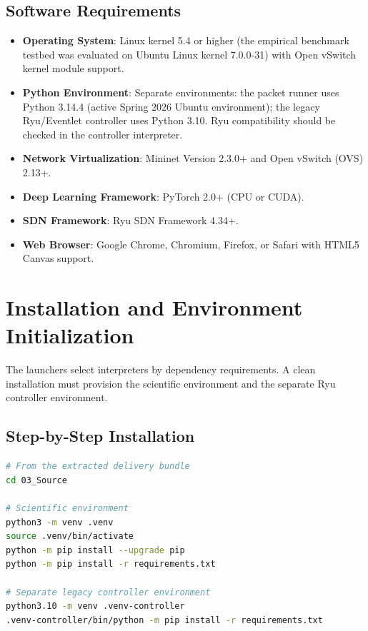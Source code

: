 \documentclass[12pt,a4paper,oneside]{report}
\begin{document}
\subsection{Software Requirements}
\begin{itemize}
    \item \textbf{Operating System}: Linux kernel 5.4 or higher (the empirical benchmark testbed was evaluated on Ubuntu Linux kernel 7.0.0-31) with Open vSwitch kernel module support.
    \item \textbf{Python Environment}: Separate environments: the packet runner uses Python 3.14.4 (active Spring 2026 Ubuntu environment); the legacy Ryu/Eventlet controller uses Python 3.10. Ryu compatibility should be checked in the controller interpreter.
    \item \textbf{Network Virtualization}: Mininet Version 2.3.0+ and Open vSwitch (OVS) 2.13+.
    \item \textbf{Deep Learning Framework}: PyTorch 2.0+ (CPU or CUDA).
    \item \textbf{SDN Framework}: Ryu SDN Framework 4.34+.
    \item \textbf{Web Browser}: Google Chrome, Chromium, Firefox, or Safari with HTML5 Canvas support.
\end{itemize}

\section{Installation and Environment Initialization}
The launchers select interpreters by dependency requirements. A clean installation must provision the scientific environment and the separate Ryu controller environment.

\subsection{Step-by-Step Installation}
\begin{lstlisting}[language=bash, caption={Platform Environment Setup}]
# From the extracted delivery bundle
cd 03_Source

# Scientific environment
python3 -m venv .venv
source .venv/bin/activate
python -m pip install --upgrade pip
python -m pip install -r requirements.txt

# Separate legacy controller environment
python3.10 -m venv .venv-controller
.venv-controller/bin/python -m pip install -r requirements.txt
\end{lstlisting}
\end{document}
